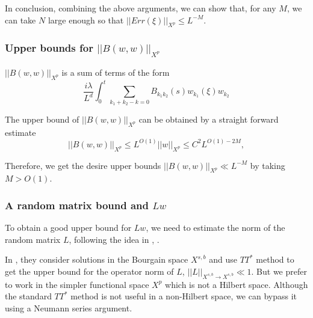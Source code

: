 In conclusion, combining the above arguments, we can show that, for any $M$, we can take $N$ large enough so that $||Err(\xi)||_{X^p}\le L^{-M}$.





\subsubsection{Upper bounds for $||B(w,w)||_{X^p}$} $||B(w,w)||_{X^p}$ is a sum of terms of the form
\begin{equation}
    \frac{i\lambda}{L^{d}} \int^{t}_0\sum_{k_1+k_2-k=0} B_{k_1k_2}(s)  w_{k_1}(\xi)w_{k_2}
\end{equation}

The upper bound of $||B(w,w)||_{X^p}$ can be obtained by a straight forward estimate
\begin{equation}
||B(w,w)||_{X^p}\le L^{O(1)} ||w||_{X^p} \le C^2 L^{O(1)-2M},
\end{equation}

Therefore, we get the desire upper bounds $||B(w,w)||_{X^p}\ll L^{-M}$ by taking $M> O(1)$.

\subsubsection{A random matrix bound and $Lw$}\label{sec.randmatintro} To obtain a good upper bound for $Lw$, we need to estimate the norm of the random matrix $L$, following the idea in \cite{deng2021derivation}, \cite{deng2021full}.

In \cite{deng2021derivation}, they consider solutions in the Bourgain space $X^{s,b}$ and use $TT^*$ method to get the upper bound for the operator norm of $L$, $||L||_{X^{s,b}\rightarrow X^{s,b}}\ll 1$. But we prefer to work in the simpler functional space $X^p$ which is not a Hilbert space. Although the standard $TT^*$ method is not useful in a non-Hilbert space, we can bypass it using a Neumann series argument.


